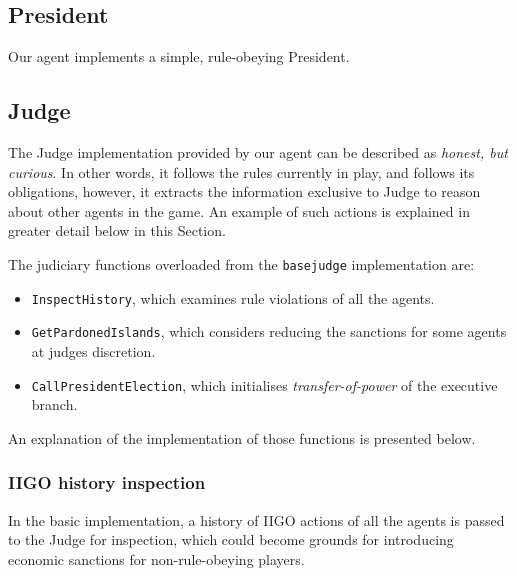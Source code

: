 \subsection{President}
\label{subsec:team4:president}
Our agent implements a simple, rule-obeying President. %








\subsection{Judge}
\label{subsec:team4:judge}
The Judge implementation provided by our agent can be described as \emph{honest, but curious}. In other words, it follows the rules currently in play, and follows its obligations, however, it extracts the information exclusive to Judge to reason about other agents in the game. An example of such actions is explained in greater detail below in this Section.

The judiciary functions overloaded from the \texttt{basejudge} implementation are:
\begin{itemize}
    \item \texttt{InspectHistory}, which examines rule violations of all the agents.
    \item \texttt{GetPardonedIslands}, which considers reducing the sanctions for some agents at judges discretion.
    \item \texttt{CallPresidentElection}, which initialises \emph{transfer-of-power} of the executive branch.
\end{itemize}
An explanation of the implementation of those functions is presented below.

\subsubsection{IIGO history inspection}
\label{subsubsec:team4:judge:inspect_history}
In the basic implementation, a history of IIGO actions of all the agents is passed to the Judge for inspection, which could become grounds for introducing economic sanctions for non-rule-obeying players. 

